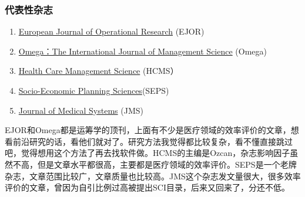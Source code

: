 \documentclass[11pt, a4paper]{article}
\begin{document}
\subsubsection{代表性杂志}
\begin{enumerate}[(1)]
	\item \href{https://www.journals.elsevier.com/european-journal-of-operational-research/}{European Journal of Operational Research} (EJOR)
	\item \href{https://www.journals.elsevier.com/omega}{Omega：The International Journal of Management Science} (Omega)
	\item \href{https://link.springer.com/journal/10729}{Health Care Management Science} (HCMS）
	\item \href{https://www.journals.elsevier.com/socio-economic-planning-sciences}{Socio-Economic Planning Sciences}(SEPS)
	\item \href{https://www.springer.com/public+health/journal/10916#}{Journal of Medical Systems} (JMS)
\end{enumerate}

EJOR和Omega都是运筹学的顶刊，上面有不少是医疗领域的效率评价的文章，想看前沿研究的话，看他们就对了。研究方法我觉得都比较复杂，看不懂直接跳过吧，觉得想用这个方法了再去找软件做。HCMS的主编是Ozcan，杂志影响因子虽然不高，但是文章水平都很高，主要都是医疗领域的效率评价。SEPS是一个老牌杂志，文章范围比较广，文章质量也比较高。JMS这个杂志发文量很大，很多效率评价的文章，曾因为自引比例过高被提出SCI目录，后来又回来了，分还不低。
\end{document}
